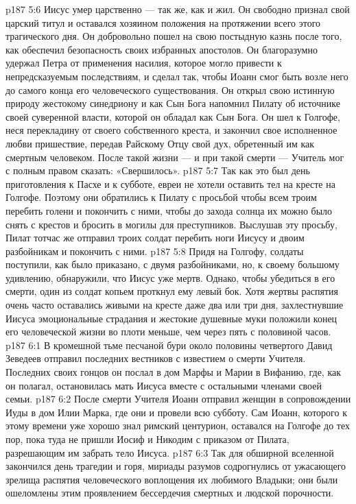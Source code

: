 \vs p187 5:6 \pc Иисус умер царственно --- так же, как и жил. Он свободно признал свой царский титул и оставался хозяином положения на протяжении всего этого трагического дня. Он добровольно пошел на свою постыдную казнь после того, как обеспечил безопасность своих избранных апостолов. Он благоразумно удержал Петра от применения насилия, которое могло привести к непредсказуемым последствиям, и сделал так, чтобы Иоанн смог быть возле него до самого конца его человеческого существования. Он открыл свою истинную природу жестокому синедриону и как Сын Бога напомнил Пилату об источнике своей суверенной власти, которой он обладал как Сын Бога. Он шел к Голгофе, неся перекладину от своего собственного креста, и закончил свое исполненное любви пришествие, передав Райскому Отцу свой дух, обретенный им как смертным человеком. После такой жизни --- и при такой смерти --- Учитель мог с полным правом сказать: «Свершилось».
\vs p187 5:7 \pc Так как это был день приготовления к Пасхе и к субботе, евреи не хотели оставить тел на кресте на Голгофе. Поэтому они обратились к Пилату с просьбой чтобы всем троим перебить голени и покончить с ними, чтобы до захода солнца их можно было снять с крестов и бросить в могилы для преступников. Выслушав эту просьбу, Пилат тотчас же отправил троих солдат перебить ноги Иисусу и двоим разбойникам и покончить с ними.
\vs p187 5:8 Придя на Голгофу, солдаты поступили, как было приказано, с двумя разбойниками, но, к своему большому удивлению, обнаружили, что Иисус уже мертв. Однако, чтобы убедиться в его смерти, один из солдат копьем проткнул ему левый бок. Хотя жертвы распятия очень часто оставались живыми на кресте даже два или три дня, захлестнувшие Иисуса эмоциональные страдания и жестокие душевные муки положили конец его человеческой жизни во плоти меньше, чем через пять с половиной часов.
\vs p187 6:1 В кромешной тьме песчаной бури около половины четвертого Давид Зеведеев отправил последних вестников с известием о смерти Учителя. Последних своих гонцов он послал в дом Марфы и Марии в Вифанию, где, как он полагал, остановилась мать Иисуса вместе с остальными членами своей семьи.
\vs p187 6:2 После смерти Учителя Иоанн отправил женщин в сопровождении Иуды в дом Илии Марка, где они и провели всю субботу. Сам Иоанн, которого к этому времени уже хорошо знал римский центурион, оставался на Голгофе до тех пор, пока туда не пришли Иосиф и Никодим с приказом от Пилата, разрешающим им забрать тело Иисуса.
\vs p187 6:3 Так для обширной вселенной закончился день трагедии и горя, мириады разумов содрогнулись от ужасающего зрелища распятия человеческого воплощения их любимого Владыки; они были ошеломлены этим проявлением бессердечия смертных и людской порочности.
